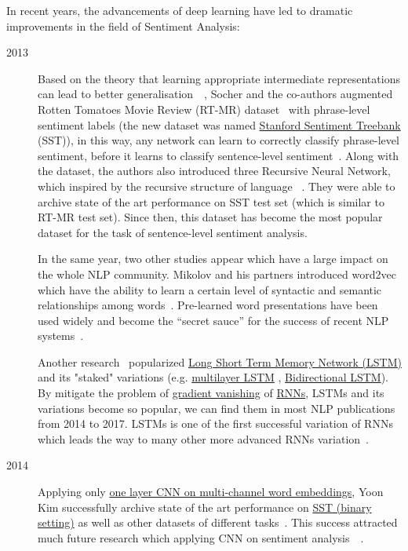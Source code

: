In recent years, the advancements of deep learning have led to dramatic improvements in the field of Sentiment Analysis:
\begin{description}
\item [2013] Based on the theory that learning appropriate intermediate representations can lead to better generalisation~\cite{knowledge-matter}~\cite{tran-auto-encoder}, Socher and the co-authors augmented Rotten Tomatoes Movie Review  (RT-MR) dataset~\cite{Rotten-Tomato} with phrase-level sentiment labels (the new dataset was named \hyperref[sec:sst]{Stanford Sentiment Treebank} (SST)), in this way, any network can learn to correctly classify phrase-level sentiment, before it learns to classify sentence-level sentiment~\cite{socher2013recursive}. Along with the dataset, the authors also introduced three Recursive Neural Network, which inspired by the recursive structure of language ~\cite{socher2013recursive}.
They were able to archive state of the art performance on SST test set (which is similar to RT-MR test set). 
Since then, this dataset has become the most popular dataset for the task of sentence-level sentiment analysis.

In the same year, two other studies appear which have a large impact on the whole NLP community. 
Mikolov and his partners introduced word2vec which have the ability to learn a certain level of syntactic and semantic relationships among words~\cite{word2vec}. 
Pre-learned word presentations have been used widely and become the “secret sauce” for the success of recent NLP systems~\cite{Luong_betterword}.

Another research~\cite{GravesLSTM} popularized \hyperref[sec:lstm]{Long Short Term Memory Network (LSTM)} and its "staked" variations (e.g. \hyperref[sec:multilayer-lstm]{multilayer LSTM} , \hyperref[sec:bilstm]{Bidirectional LSTM}).
By mitigate the problem of \hyperref[sec:gradient-vanish]{gradient vanishing} of \hyperref[sec:RNN]{RNNs}, LSTMs and its variations become so popular, we can find them in most NLP publications from 2014 to 2017. 
LSTMs is one of the first successful variation of RNNs which leads the way to many other more advanced RNNs variation~\cite{olah2016attention}.
\item [2014] Applying only \hyperref[kim-cnn]{one layer CNN on multi-channel word embeddings}, Yoon Kim successfully archive state of the art performance on \hyperref[sec:sst]{SST (binary setting)} as well as other datasets of different tasks~\cite{KimCNN}. 
This success attracted much future research which applying CNN on sentiment analysis~\cite{2-layer-cnn}~\cite{cnn-rnn}.


\end{description}
